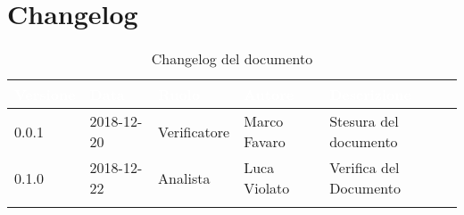 \newpage

\section{Changelog}

\begin{center}
\begin{longtable}[c]{|m{}|m{}|m{}|m{}|p{}|}
\hline
\rowcolor{bluelogo}\textbf{\textcolor{white}{Versione}} & \textbf{\textcolor{white}{Data}} & \textbf{\textcolor{white}{Ruolo}} & \textbf{\textcolor{white}{Autore}} & \textbf{\textcolor{white}{Descrizione}}\\
\hline \hline
\endfirsthead
0.0.1 & 2018-12-20  & Verificatore & Marco Favaro & Stesura del documento \\
\hline
\rowcolor{grigio} 0.1.0 & 2018-12-22 & Analista & Luca Violato & Verifica del Documento \\
\hline
\caption{Changelog del documento}
\end{longtable}
\end{center}

